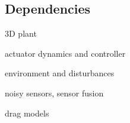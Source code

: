 \subsection{Dependencies}

3D plant

actuator dynamics and controller

environment and disturbances

noisy sensors, sensor fusion

drag models